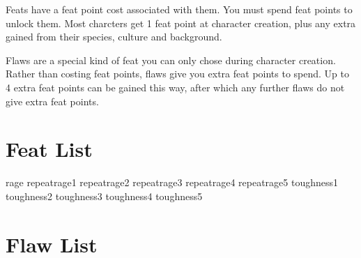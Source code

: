 \begin{multicols*}{2}
    Feats have a feat point cost associated with them. You must spend feat
    points to unlock them. Most charcters get 1 feat point at character
    creation, plus any extra gained from their species, culture and background.

    Flaws are a special kind of feat you can only chose during character
    creation. Rather than costing feat points, flaws give you extra feat
    points to spend. Up to 4 extra feat points can be gained this way, after
    which any further flaws do not give extra feat points.

    \section{Feat List}
    {rage}
    {repeatrage1}
    {repeatrage2}
    {repeatrage3}
    {repeatrage4}
    {repeatrage5}
    {toughness1}
    {toughness2}
    {toughness3}
    {toughness4}
    {toughness5}

    \section{Flaw List}
\end{multicols*}
